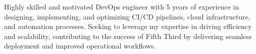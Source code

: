 

Highly skilled and motivated DevOps engineer with 5 years of experience in designing, implementing, and optimizing CI/CD pipelines, cloud infrastructure, and automation processes. Seeking to leverage my expertise in driving efficiency and scalability, contributing to the success of Fifth Third by delivering seamless deployment and improved operational workflows.